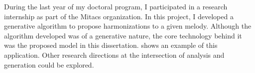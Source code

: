 
During the last year of my doctoral program, I participated
in a research internship as part of the Mitacs
organization.
In this project, I developed a generative algorithm to
propose harmonizations to a given melody. Although the
algorithm developed was of a generative nature, the core
technology behind it was the proposed model in this
dissertation.  shows an example
of this application. Other research directions at the
intersection of analysis and generation could be explored.

